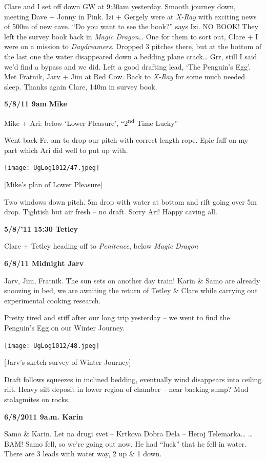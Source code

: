 Clare and I set off down GW at 9:30am yesterday. Smooth journey down,
meeting Dave + Jonny in Pink. Izi + Gergely were at \emph{X-Ray} with
exciting news of 500m of new cave. ``Do you want to see the book?'' says
Izi. NO BOOK! They left the survey book back in \emph{Magic
Dragon}\ldots{} One for them to sort out, Clare + I were on a mission to
\emph{Daydreamers}. Dropped 3 pitches there, but at the bottom of the
last one the water disappeared down a bedding plane crack\ldots{} Grr,
still I said we'd find a bypass and we did. Left a good drafting lead,
`The Penguin's Egg'. Met Fratnik, Jarv + Jim at Red Cow. Back to
\emph{X-Ray} for some much needed sleep. Thanks again Clare, 140m in
survey book.

\textbf{5/8/11 9am} \textbf{Mike}

Mike + Ari: below `Lower Pleasure', ``2\textsuperscript{nd} Time Lucky''

Went back Fr. am to drop our pitch with correct length rope. Epic faff
on my part which Ari did well to put up with.

\texttt{[image: UgLog1012/47.jpeg]}

{[}Mike's plan of Lower Pleasure{]}

Two windows down pitch. 5m drop with water at bottom and rift going over
5m drop. Tightish but air fresh -- no draft. Sorry Ari! Happy caving
all.

\textbf{5/8/'11 15:30 Tetley}

Clare + Tetley heading off to \emph{Penitence}, below \emph{Magic
Dragon}

\textbf{6/8/11 Midnight Jarv}

Jarv, Jim, Fratnik. The sun sets on another day train! Karin \& Samo are
already snoozing in bed, we are awaiting the return of Tetley \& Clare
while carrying out experimental cooking research.

Pretty tired and stiff after our long trip yesterday -- we went to find
the Penguin's Egg on our Winter Journey.

\texttt{[image: UgLog1012/48.jpeg]}

{[}Jarv's sketch survey of Winter Journey{]}

Draft follows squeezes in inclined bedding, eventually wind disappears
into ceiling rift. Heavy silt deposit in lower region of chamber -- near
backing sump? Mud stalagmites on rocks.

\textbf{6/8/2011 9a.m. Karin}

Samo \& Karin. Let na drugi svet -- Krtkova Dobra Dela -- Heroj
Telemarka\ldots{} \ldots{}BAM! Samo fell, so we're going out now. He had
``luck'' that he fell in water. There are 3 leads with water way, 2 up
\& 1 down.

